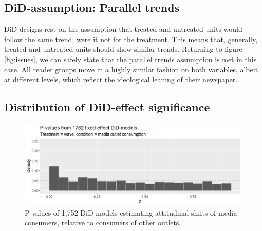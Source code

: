 \documentclass{article}
\begin{document}
\newpage

\subsection{DiD-assumption: Parallel trends}\label{sec:did_ass}


DiD-designs rest on the assumption that treated and untreated units would follow the same trend, were it not for the treatment. This means that, generally, treated and untreated units should show similar trends. Returning to figure \ref{fig:issues}, we can safely state that the parallel trends assumption is met in this case. All reader groups move in a highly similar fashion on both variables, albeit at different levels, which reflect the ideological leaning of their newspaper.

\subsection{Distribution of DiD-effect significance}\label{sec:did_sig}

\begin{figure}[!ht]
    \centering
    \includegraphics[width=\textwidth]{paper/vis/DiD_model_ps_notheory.png}
    \caption{P-values of 1,752 DiD-models estimating attitudinal shifts of media consumers, relative to consumers of other outlets.}
    \label{fig:p_values}
\end{figure}
\end{document}
